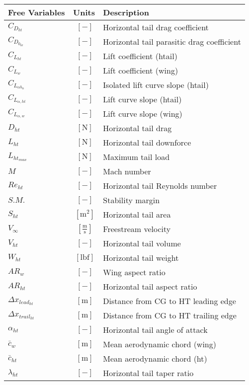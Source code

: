 \documentclass[12pt]{article}
\begin{document}
{\footnotesize
\begin{supertabular}{lcl}
\toprule
Free Variables & Units & Description \\ \midrule
$C_{D_{ht}}$ & $~[-]$ & Horizontal tail drag coefficient \\
$C_{D_{0_{ht}}}$ & $~[-]$ & Horizontal tail parasitic drag coefficient \\
$C_{L_{ht}}$ & $~[-]$ & Lift coefficient (htail) \\
$C_{L_w}$ & $~[-]$ & Lift coefficient (wing) \\
$C_{L_{\alpha h_{0}}}$ & $~[-]$ & Isolated lift curve slope (htail) \\
$C_{L_{\alpha,ht}}$ & $~[-]$ & Lift curve slope (htail) \\
$C_{L_{\alpha,w}}$ & $~[-]$ & Lift curve slope (wing) \\
$D_{ht}$ & $~\mathrm{[N]}$ & Horizontal tail drag \\
$L_{ht}$ & $~\mathrm{[N]}$ & Horizontal tail downforce \\
$L_{ht_{max}}$ & $~\mathrm{[N]}$ & Maximum tail load \\
$M$ & $~[-]$ & Mach number \\
$Re_{ht}$ & $~[-]$ & Horizontal tail Reynolds number \\  
$S.M.$ & $~[-]$ & Stability margin \\
$S_{ht}$ & $~\mathrm{[m^{2}]}$ & Horizontal tail area \\
$V_{\infty}$ & $~\mathrm{[\tfrac{m}{s}]}$ & Freestream velocity \\
$V_{ht}$ & $~[-]$ & Horizontal tail volume\\
$W_{ht}$ & $~\mathrm{[lbf]}$ & Horizontal tail weight \\
$AR_w$ & $~[-]$ & Wing aspect ratio \\
$AR_{ht}$ & $~[-]$ & Horizontal tail aspect ratio \\
$\Delta x_{lead_{ht}}$ & $~\mathrm{[m]}$ & Distance from CG to HT leading edge \\
$\Delta x_{trail_{ht}}$ & $~\mathrm{[m]}$ & Distance from CG to HT trailing edge \\
$\alpha_{ht}$ & $~[-]$ & Horizontal tail angle of attack \\
$\bar{c}_w$ & $~\mathrm{[m]}$ & Mean aerodynamic chord (wing) \\
$\bar{c}_{ht}$ & $~\mathrm{[m]}$ & Mean aerodynamic chord (ht) \\
$\lambda_{ht}$ & $~[-]$ & Horizontal tail taper ratio \\

\end{supertabular}}
\end{document}
